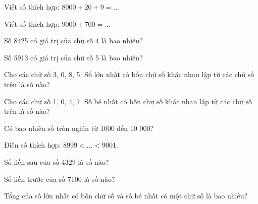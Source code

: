 \begin{ex}
Viết số thích hợp: $8000 + 20 + 9 = \dots$
\end{ex}

\begin{ex}
Viết số thích hợp: $9000 + 700 = \dots$
\end{ex}

\begin{ex}
Số 8425 có giá trị của chữ số 4 là bao nhiêu?
\end{ex}

\begin{ex}
Số 5913 có giá trị của chữ số 5 là bao nhiêu?
\end{ex}

\begin{ex}
Cho các chữ số 3, 0, 8, 5. Số lớn nhất có bốn chữ số khác nhau lập từ các chữ số trên là số nào?
\end{ex}

\begin{ex}
Cho các chữ số 1, 0, 4, 7. Số bé nhất có bốn chữ số khác nhau lập từ các chữ số trên là số nào?
\end{ex}

\begin{ex}
Có bao nhiêu số tròn nghìn từ 1000 đến 10 000?
\end{ex}

\begin{ex}
Điền số thích hợp: $8999 < \dots < 9001$.
\end{ex}

\begin{ex}
Số liền sau của số 4329 là số nào?
\end{ex}

\begin{ex}
Số liền trước của số 7100 là số nào?
\end{ex}

\begin{ex}
Tổng của số lớn nhất có bốn chữ số và số bé nhất có một chữ số là bao nhiêu?
\end{ex}

